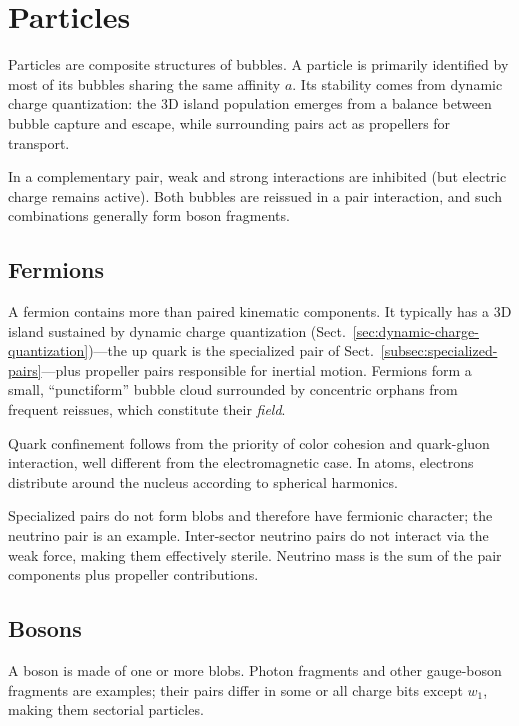 \documentclass{ijuc}
\begin{document}

\section{Particles\label{sec:Particles}}

Particles are composite structures of bubbles. A particle is primarily identified by most of its bubbles sharing the same affinity $a$. Its stability comes from dynamic charge quantization: the 3D island population emerges from a balance between bubble capture and escape, while surrounding pairs act as propellers for transport.

In a complementary pair, weak and strong interactions are inhibited (but electric charge remains active). Both bubbles are reissued in a pair interaction, and such combinations generally form boson fragments.

\subsection{Fermions}
A fermion contains more than paired kinematic components. It typically has a 3D island sustained by dynamic charge quantization (Sect.~\ref{sec:dynamic-charge-quantization})—the up quark is the specialized pair of Sect.~\ref{subsec:specialized-pairs}—plus propeller pairs responsible for inertial motion. Fermions form a small, ``punctiform'' bubble cloud surrounded by concentric orphans from frequent reissues, which constitute their \textit{field}.

Quark confinement follows from the priority of color cohesion and quark-gluon interaction, well different from the electromagnetic case. In atoms, electrons distribute around the nucleus according to spherical harmonics.

Specialized pairs do not form blobs and therefore have fermionic character; the neutrino pair is an example. Inter-sector neutrino pairs do not interact via the weak force, making them effectively sterile. Neutrino mass is the sum of the pair components plus propeller contributions.

\subsection{Bosons}\label{bosons}
A boson is made of one or more blobs. Photon fragments and other gauge-boson fragments are examples; their pairs differ in some or all charge bits except $w_1$, making them sectorial particles.
\end{document}
